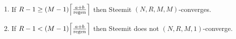 \begin{theorem}
  \label{theorem:convergence:steem} \
  \begin{enumerate}
    \item \label{theorem:case:manyrounds} If $R-1 \geq (M-1)
    \ceil*{\frac{a+b}{\mathrm{regen}}}$ then Steemit $(N,R,M,M)$-converges.
    \item \label{theorem:case:fewrounds} If $R-1 < (M-1)
    \ceil*{\frac{a+b}{\mathrm{regen}}}$ then Steemit does not
    $(N,R,M,1)$-converge.
  \end{enumerate}
\end{theorem}
